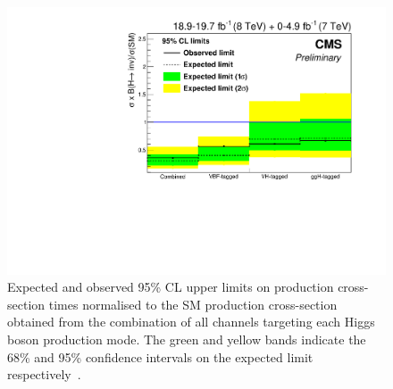 \begin{figure}
  \includegraphics[width=\largefigwidth]{plots/comb/HIG-15-012-figs/channellimit.pdf}
  \caption[Expected and observed 95\% CL upper limits on production cross-section times \BRinv normalised to the SM production cross-section obtained from the combination of all channels targeting each Higgs boson production mode. The green and yellow bands indicate the 68\% and 95\% confidence intervals on the expected limit respectively.]{Expected and observed 95\% CL upper limits on production cross-section times \BRinv normalised to the SM production cross-section obtained from the combination of all channels targeting each Higgs boson production mode. The green and yellow bands indicate the 68\% and 95\% confidence intervals on the expected limit respectively~\cite{CMS-PAS-HIG-15-012}.}
  \label{fig:parkedcombchannel}
\end{figure}

